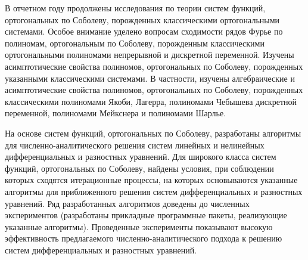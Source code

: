 

В отчетном году продолжены исследования по теории систем функций, ортогональных по Соболеву, порожденных классическими ортогональными системами.
Особое внимание уделено вопросам сходимости рядов Фурье по полиномам, ортогональным по Соболеву, порожденным классическими ортогональными полиномами непрерывной и дискретной переменной.
Изучены асимптотические свойства полиномов, ортогональных по Соболеву, порожденных указанными классическими системами. В частности, изучены алгебраические и асимптотические свойства полиномов, ортогональных по Соболеву, порожденных классическими полиномами Якоби, Лагерра, полиномами Чебышева дискретной переменной, полиномами Мейкснера и полиномами Шарлье.

На основе систем функций, ортогональных по Соболеву, разработаны алгоритмы для численно-аналитического решения систем линейных и нелинейных дифференциальных и разностных уравнений. Для широкого класса систем функций, ортогональных по Соболеву, найдены условия, при соблюдении которых сходятся итерационные процессы, на которых основываются указанные алгоритмы для приближенного решения систем дифференциальных и разностных уравнений.
Ряд разработанных алгоритмов доведены до численных экспериментов (разработаны прикладные программные пакеты, реализующие указанные алгоритмы).
Проведенные эксперименты показывают высокую эффективность предлагаемого численно-аналитического подхода к решению систем дифференциальных и разностных уравнений.







